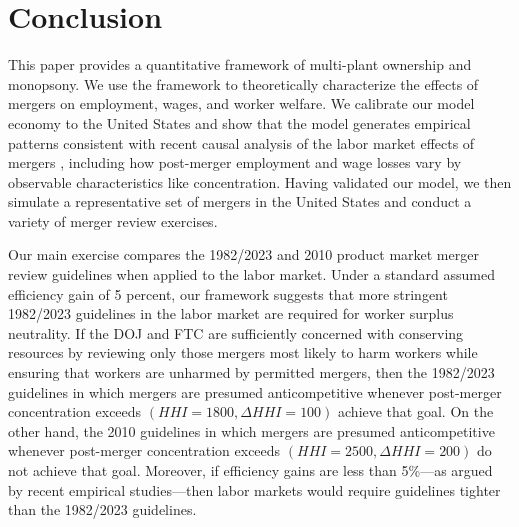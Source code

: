 \documentclass[12pt]{article}
\theoremstyle{prop}
\begin{document}
\section{Conclusion}
 
This paper provides a quantitative framework of multi-plant ownership and monopsony. 
We use the framework to theoretically characterize the effects of mergers on employment, wages, and worker welfare. 
We calibrate our model economy to the United States and show that the model generates empirical patterns consistent with recent causal analysis of the labor market effects of mergers \citep{Arnold}, including how post-merger employment and wage losses vary by observable characteristics like concentration. Having validated our model, we then simulate a representative set of mergers in the United States and conduct a variety of merger review exercises. 

Our main exercise compares the 1982/2023 and 2010 product market merger review guidelines when applied to the labor market. 
Under a standard assumed efficiency gain of 5 percent, our framework suggests that more stringent 1982/2023 guidelines in the labor market are required for worker surplus neutrality.
If the DOJ and FTC are sufficiently concerned with conserving resources by reviewing only those mergers most likely to harm workers while ensuring that workers are unharmed by permitted mergers, then the 1982/2023 guidelines in which mergers are presumed anticompetitive whenever post-merger concentration exceeds $(HHI=1800, \Delta HHI=100)$ achieve that goal. 
On the other hand, the 2010 guidelines in which mergers are presumed anticompetitive whenever post-merger concentration exceeds  $(HHI=2500, \Delta HHI=200)$ do not achieve that goal.  
Moreover, if efficiency gains are less than 5\%---as argued by recent empirical studies---then labor markets would require guidelines tighter than the 1982/2023 guidelines. 
\end{document}
